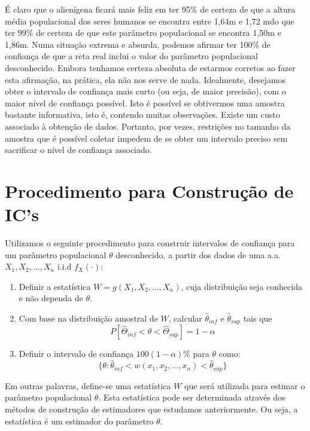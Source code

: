 \documentclass[
]{book}
\theoremstyle{definition}
\theoremstyle{definition}
\theoremstyle{definition}
\theoremstyle{remark}
\begin{document}
É claro que o alienígena ficará mais feliz em ter 95\% de certeza de que a altura média populacional dos seres humanos se encontra entre 1,64m e 1,72 mdo que ter 99\% de certeza de que este parâmetro populacional se encontra 1,50m e 1,86m. Numa situação extrema e absurda, podemos afirmar ter 100\% de confiança de que a reta real inclui o valor do parâmetro populacional desconhecido. Embora tenhamos certeza absoluta de estarmos corretos ao fazer esta afirmação, na prática, ela não nos serve de nada. Idealmente, desejamos obter o intervalo de confiança mais curto (ou seja, de maior precisão), com o maior nível de confiança possível. Isto é possível se obtivermos uma amostra bastante informativa, isto é, contendo muitas observações. Existe um custo associado à obtenção de dados. Portanto, por vezes, restrições no tamanho da amostra que é possível coletar impedem de se obter um intervalo preciso sem sacrificar o nível de confiança associado.

\hypertarget{procedimento-para-construuxe7uxe3o-de-ics}{%
\section{Procedimento para Construção de IC's}\label{procedimento-para-construuxe7uxe3o-de-ics}}

Utilizamos o seguinte procedimento para construir intervalos de confiança para um parâmetro populacional \(\theta\) desconhecido, a partir dos dados de uma a.a. \(X_1, X_2, \ldots, X_n\) i.i.d \(f_X(\cdot)\):

\begin{enumerate}
\def\labelenumi{\arabic{enumi})}
\item
  Definir a estatística \(W = g(X_1, X_2, \ldots, X_n)\), cuja distribuição seja conhecida e não dependa de \(\theta\).
\item
  Com base na distribuição amostral de \(W\), calcular \(\hat\theta_{inf}\) e \(\hat\theta_{sup}\) tais que
  \[P[\hat\Theta_{inf} < \theta < \hat\Theta_{sup}] = 1-\alpha\]
\item
  Definir o intervalo de confiança \(100(1-\alpha)\%\) para \(\theta\) como:
  \[\{\theta: \hat\theta_{inf} < w(x_1, x_2, \ldots, x_n) < \hat\theta_{sup}\}\]
\end{enumerate}

Em outras palavras, define-se uma estatística \(W\) que será utilizada para estimar o parâmetro populacional \(\theta\). Esta estatística pode ser determinada através dos métodos de construção de estimadores que estudamos anteriormente. Ou seja, a estatística é um estimador do parâmetro \(\theta\).
\end{document}

